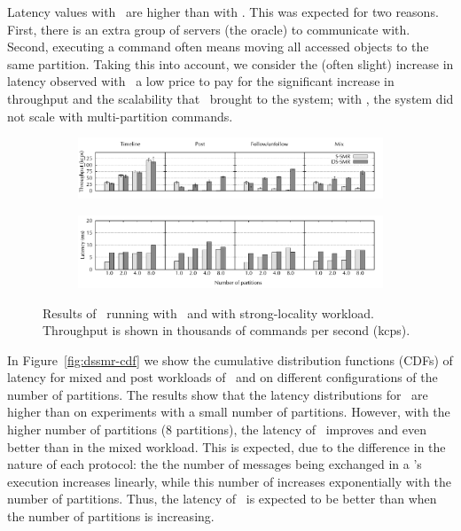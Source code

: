 Latency values with \dssmr\ are higher than with \ssmr{}. This was expected for
two reasons. First, there is an extra group of servers (the oracle) to
communicate with. Second, executing a command often means moving all accessed
objects to the same partition. Taking this into account, we consider the (often
slight) increase in latency observed with \dssmr\ a low price to pay for the
significant increase in throughput and the scalability that \dssmr\ brought to
the system; with \ssmr{}, the system did not scale with multi-partition
commands.


\begin{figure}[ht!]
\centering
\begin{subfigure}{1\columnwidth}
      \centering
      \includegraphics[width=\textwidth]{./figures/experiments/dssmr/dssmr-strong-locality-tp}
\end{subfigure}
\begin{subfigure}{1\columnwidth}
      \centering
      \includegraphics[width=\textwidth]{./figures/experiments/dssmr/dssmr-strong-locality-lat}
\end{subfigure}
\caption{Results of \dssmrappname\ running with \ssmr\ and \dssmr{} with strong-locality workload. Throughput is shown in thousands of commands per second (kcps).}
\label{fig:dssmr-strongloc}
\end{figure}

In Figure~\ref{fig:dssmr-cdf} we show the cumulative distribution functions
(CDFs) of latency for mixed and post workloads of \dssmr\ and \ssmr on different
configurations of the number of partitions. The results show that the latency
distributions for \dssmr\ are higher than \ssmr on experiments with a small
number of partitions. However, with the higher number of partitions (8
partitions), the latency of \dssmr\ improves and even better than \ssmr in the
mixed workload. This is expected, due to the difference in the nature of each
protocol: the the number of messages being exchanged in a \dssmr's execution
increases linearly, while this number of \ssmr increases exponentially with the
number of partitions. Thus, the latency of \dssmr\ is expected to be better than
\ssmr when the number of partitions is increasing.

